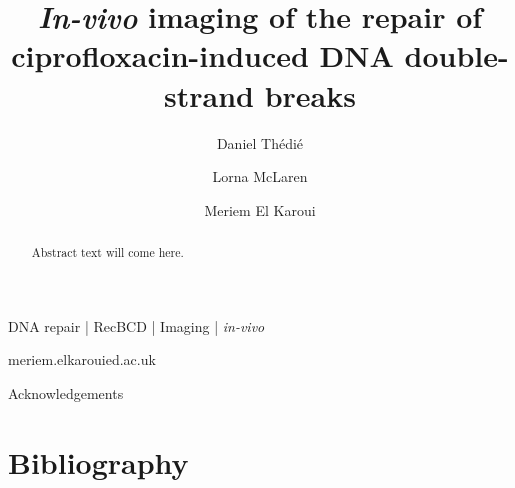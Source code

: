 \documentclass[times, twoside]{zHenriquesLab-StyleBioRxiv}
\begin{document}
\title{\emph{In-vivo} imaging of the repair of ciprofloxacin-induced DNA double-strand breaks}
\shorttitle{}

\author[1]{Daniel Thédié}
\author[1]{Lorna McLaren}
\author[1]{Meriem El Karoui}



\maketitle

\begin{abstract}
Abstract text will come here.
\end{abstract}

\begin{keywords}
DNA repair | RecBCD | Imaging | \emph{in-vivo}
\end{keywords}

\begin{corrauthor}
meriem.elkaroui\at ed.ac.uk
\end{corrauthor}













\begin{acknowledgements}
Acknowledgements
\end{acknowledgements}

\section*{Bibliography}


\onecolumn
\newpage


\end{document}
